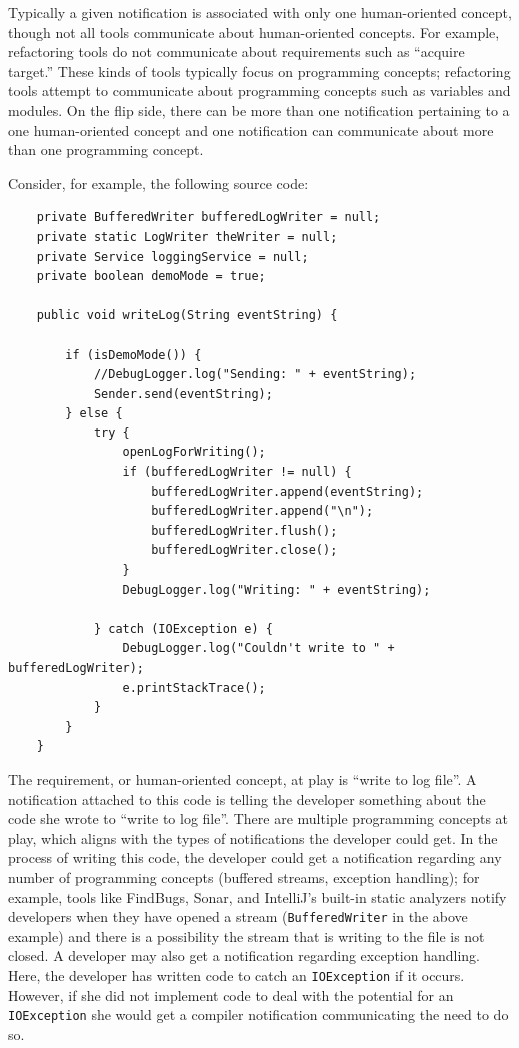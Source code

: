 \documentclass{llncs}
\begin{document}
Typically a given notification is associated with only one human-oriented concept, though not all tools communicate about human-oriented concepts. For example, refactoring tools do not communicate about requirements such as ``acquire target.'' These kinds of tools typically focus on programming concepts; refactoring tools attempt to communicate about programming concepts such as variables and modules.
On the flip side, there can be more than one notification pertaining to a one human-oriented concept and one notification can communicate about more than one programming concept. 


Consider, for example, the following source code:

\begin{lstlisting}
	private BufferedWriter bufferedLogWriter = null;
	private static LogWriter theWriter = null;
	private Service loggingService = null;
	private boolean demoMode = true;
	
	public void writeLog(String eventString) {
	
		if (isDemoMode()) {
			//DebugLogger.log("Sending: " + eventString);
			Sender.send(eventString);
		} else {
			try {
				openLogForWriting();
				if (bufferedLogWriter != null) {
					bufferedLogWriter.append(eventString);
					bufferedLogWriter.append("\n");
					bufferedLogWriter.flush();
					bufferedLogWriter.close();
				}
				DebugLogger.log("Writing: " + eventString);
	
			} catch (IOException e) {
				DebugLogger.log("Couldn't write to " + bufferedLogWriter);
				e.printStackTrace();
			}
		}
	}
\end{lstlisting}

The requirement, or human-oriented concept, at play is ``write to log file''. 
A notification attached to this code is telling the developer something about the code she wrote to ``write to log file''.
There are multiple programming concepts at play, which aligns with the types of notifications the developer could get. 
In the process of writing this code, the developer could get a notification regarding any number of programming concepts (buffered streams, exception handling); for example, tools like FindBugs, Sonar, and IntelliJ's built-in static analyzers notify developers when they have opened a stream (\texttt{BufferedWriter} in the above example) and there is a possibility the stream that is writing to the file is not closed.
A developer may also get a notification regarding exception handling. Here, the developer has written code to catch an \texttt{IOException} if it occurs. However, if she did not implement code to deal with the potential for an \texttt{IOException} she would get a compiler notification communicating the need to do so.
\end{document}
